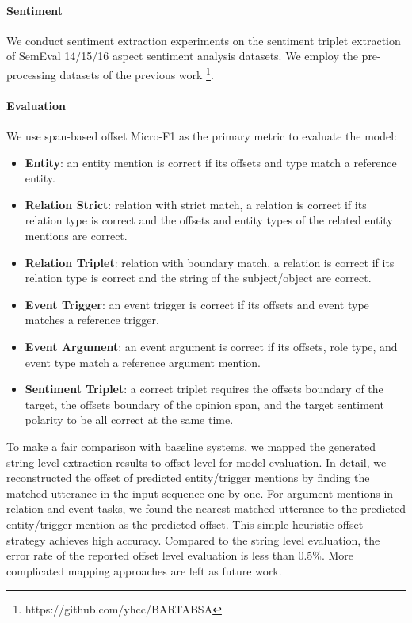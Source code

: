 \documentclass[11pt]{article}
\begin{document}
\paragraph{Sentiment}
We conduct sentiment extraction experiments on the sentiment triplet extraction \citep{xu-etal-2020-position} of SemEval 14/15/16 aspect sentiment analysis datasets.
We employ the pre-processing datasets of the previous work \citep{yan-etal-2021-unified}\footnote{https://github.com/yhcc/BARTABSA}.


\paragraph{Evaluation}
We use span-based offset Micro-F1 as the primary metric to evaluate the model:
\begin{itemize}[nosep,leftmargin=*]
\item \textbf{Entity}: an entity mention is correct if its offsets and type match a reference entity.
\item \textbf{Relation Strict}: relation with strict match, a relation is correct if its relation type is correct and the offsets and entity types of the related entity mentions are correct.
\item \textbf{Relation Triplet}: relation with boundary match, a relation is correct if its relation type is correct and the string of the subject/object are correct.
\item \textbf{Event Trigger}: an event trigger is correct if its offsets and event type matches a reference trigger.
\item \textbf{Event Argument}: an event argument is correct if its offsets, role type, and event type match a reference argument mention.
\item \textbf{Sentiment Triplet}: a correct triplet requires the offsets boundary of the target, the offsets boundary of the opinion span, and the target sentiment polarity to be all correct at the same time.
\end{itemize}
To make a fair comparison with baseline systems, we mapped the generated string-level extraction results to offset-level for model evaluation.  
In detail, we reconstructed the offset of predicted entity/trigger mentions by finding the matched utterance in the input sequence one by one.
For argument mentions in relation and event tasks, we found the nearest matched utterance to the predicted entity/trigger mention as the predicted offset.
This simple heuristic offset strategy achieves high accuracy.
Compared to the string level evaluation, the error rate of the reported offset level evaluation is less than 0.5\%.
More complicated mapping approaches are left as future work.
\end{document}
